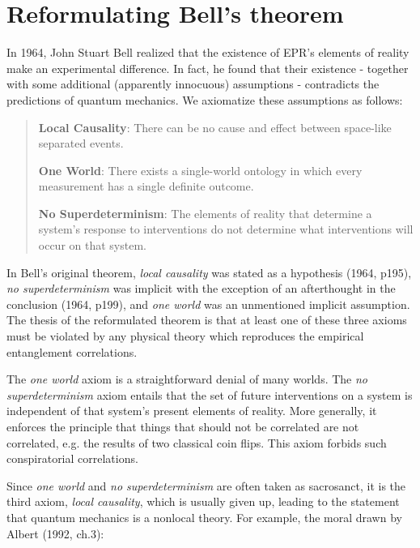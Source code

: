 \documentclass[12pt]{article}
\begin{document}
\section{Reformulating Bell's theorem} \label{Bell}

In 1964, John Stuart Bell realized that the existence of EPR's elements of reality make an experimental difference. In fact, he found that their existence - together with some additional (apparently innocuous) assumptions - contradicts the predictions of quantum mechanics. We axiomatize these assumptions as follows:

\begin{quote}

\textbf{Local Causality}: There can be no cause and effect between space-like separated events.

\textbf{One World}: There exists a single-world ontology in which every measurement has a single definite outcome.

\textbf{No Superdeterminism}: The elements of reality that determine a system's response to interventions do not determine what interventions will occur on that system. 

\end{quote}

In Bell's original theorem, \textit{local causality} was stated as a hypothesis (1964, p195), \textit{no superdeterminism} was implicit with the exception of an afterthought in the conclusion (1964, p199), and \textit{one world} was an unmentioned implicit assumption. The thesis of the reformulated theorem is that at least one of these three axioms must be violated by any physical theory which reproduces the empirical entanglement correlations.

The \textit{one world} axiom is a straightforward denial of many worlds.  The \textit{no superdeterminism} axiom entails that the set of future interventions on a system is independent of that system's present elements of reality. More generally, it enforces the principle that things that should not be correlated are not correlated, e.g. the results of two classical coin flips. This axiom forbids such conspiratorial correlations. 

Since \textit{one world} and \textit{no superdeterminism} are often taken as sacrosanct, it is the third axiom, \textit{local causality}, which is usually given up, leading to the statement that quantum mechanics is a nonlocal theory. For example, the moral drawn by Albert (1992, ch.3):
\end{document}
